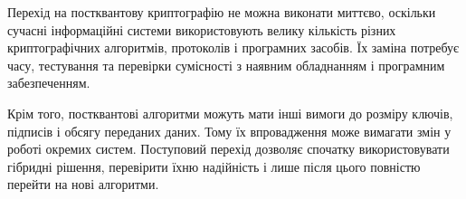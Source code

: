 Перехід на постквантову криптографію не можна виконати миттєво, оскільки сучасні інформаційні системи використовують 
велику кількість різних криптографічних алгоритмів, протоколів і програмних засобів. Їх заміна потребує часу, тестування 
та перевірки сумісності з наявним обладнанням і програмним забезпеченням.

Крім того, постквантові алгоритми можуть мати інші вимоги до розміру ключів, підписів і обсягу переданих даних. 
Тому їх впровадження може вимагати змін у роботі окремих систем. Поступовий перехід дозволяє спочатку використовувати гібридні рішення, 
перевірити їхню надійність і лише після цього повністю перейти на нові алгоритми.
